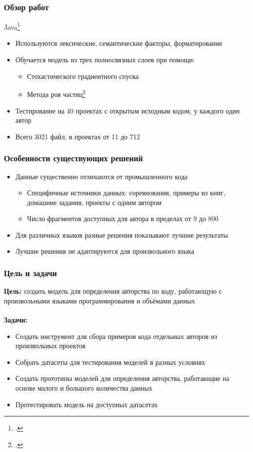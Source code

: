 \documentclass[xcolor=table]{beamer}
\begin{document}
\begin{frame}
	\frametitle{Обзор работ}
	Java\footcite{yang2017}
	\begin{itemize}
		\item Используются лексические, семантические факторы, форматирование
		\item Обучается модель из трех полносвязных слоев при помощи:
		\begin{itemize}
			\item Стохастического градиентного спуска
			\item Метода роя частиц\footcite{Kennedy1995}
		\end{itemize}
		\item Тестирование на 40 проектах с открытым исходным кодом, у каждого один автор
		\item Всего 3021 файл, в проектах от 11 до 712		
	\end{itemize}
\end{frame}


\begin{frame}
	\frametitle{Особенности существующих решений}
	\begin{itemize}
		\item Данные существенно отличаются от промышленного кода
		\begin{itemize}
			\item Специфичные источники данных: соревнования, примеры из книг, домашние задания, проекты с одним автором
			\item Число фрагментов доступных для автора в пределах от 9 до 800
		\end{itemize}
		\item Для различных языков разные решения показывают лучшие результаты
		\item Лучшие решения не адаптируются для произвольного языка
	\end{itemize}
\end{frame}

\begin{frame}
	\frametitle{Цель и задачи}
	\textbf{Цель:} создать модель для определения авторства по коду, работающую с произвольными языками программирования и объёмами данных\\~\\
	\textbf{Задачи:}
	\begin{itemize}
		\item Создать инструмент для сбора примеров кода отдельных авторов из произвольных проектов
		\item Собрать датасеты для тестирования моделей в разных условиях
		\item Создать прототипы моделей для определения авторства, работающие на основе малого и большого количества данных
		\item Протестировать модель на доступных датасетах
	\end{itemize}
\end{frame}
\end{document}
